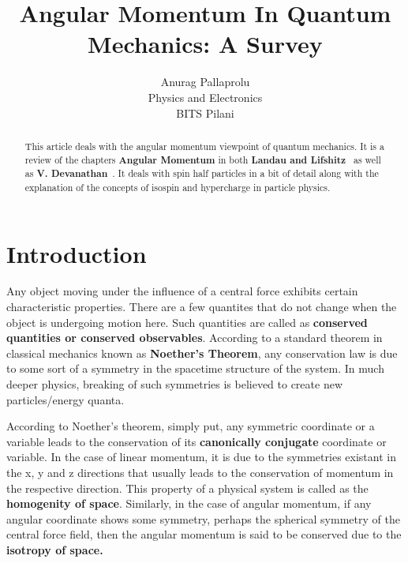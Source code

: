 \documentclass[12pt]{article}
\begin{document}
\title{Angular Momentum In Quantum Mechanics: A Survey}
\author{Anurag Pallaprolu \\Physics and Electronics\\ BITS Pilani}
\maketitle
\begin{abstract}
This article deals with the angular momentum viewpoint of quantum mechanics. It is a review of the chapters \textbf{Angular Momentum} in both \textbf{Landau and Lifshitz}~\cite{LL} as well as \textbf{V. Devanathan}~\cite{Dev}. It deals with spin half particles in a bit of detail along with the explanation of the concepts of isospin and hypercharge in particle physics.
\end{abstract}
\tableofcontents
\setcounter{tocdepth}{3}
\clearpage
\section*{Introduction}
Any object moving under the influence of a central force exhibits certain characteristic properties. There are a few quantites that do not change when the object is undergoing motion here. Such quantities are called as \textbf{conserved quantities or conserved observables}. According to a standard theorem in classical mechanics known as \textbf{Noether's Theorem}, any conservation law is due to some sort of a symmetry in the spacetime structure of the system. In much deeper physics, breaking of such symmetries is believed to create new particles/energy quanta. 

According to Noether's theorem, simply put, any symmetric coordinate or a variable leads to the conservation of its \textbf{canonically conjugate} coordinate or variable. In the case of linear momentum, it is due to the symmetries existant in the x, y and z directions that usually leads to the conservation of momentum in the respective direction. This property of a physical system is called as the \textbf{homogenity of space}. Similarly, in the case of angular momentum, if any angular coordinate shows some symmetry, perhaps the spherical symmetry of the central force field, then the angular momentum is said to be conserved due to the \textbf{isotropy of space.}
\end{document}
